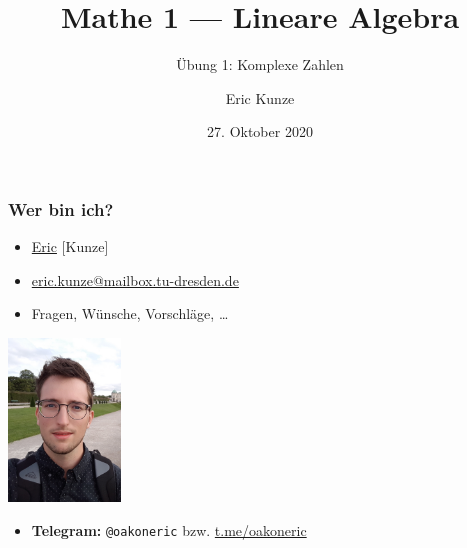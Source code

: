 \documentclass{beamer}
\begin{document}
	
	\title{Mathe 1 --- Lineare Algebra}
	\subtitle{Übung 1: Komplexe Zahlen }
	\author{Eric Kunze}
	\date{27. Oktober 2020}

	\maketitle
	
	\begin{frame} \frametitle{Wer bin ich?}
		\begin{minipage}{\dimexpr0.75\linewidth-\fboxrule-\fboxsep}
			\begin{itemize}
				\item \uline{Eric} [Kunze]
				\item \url{eric.kunze@mailbox.tu-dresden.de}
				\item Fragen, Wünsche, Vorschläge, \dots 
			\end{itemize}
		\end{minipage}
		\begin{minipage}{\dimexpr0.25\linewidth-\fboxrule-\fboxsep}
			\includegraphics[width=3cm]{./tut01_pic.jpg}
		\end{minipage}		
	
	\begin{itemize}
		\item \textbf{Telegram:} \texttt{@oakoneric} bzw. \url{t.me/oakoneric}
	\end{itemize}
	\end{frame}
\end{document}
